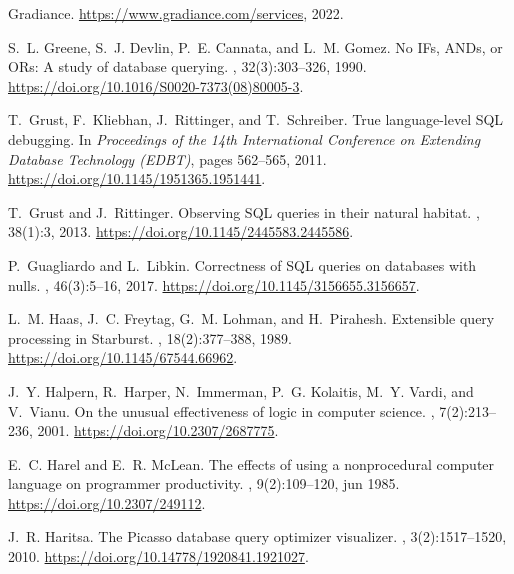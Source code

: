 \documentclass[letterpaper,11pt]{article}
\begin{document}
\begin{thebibliography}{100}
{Gradiance}.
\newblock \url{https://www.gradiance.com/services}, 2022.

S.~L. Greene, S.~J. Devlin, P.~E. Cannata, and L.~M. Gomez.
\newblock No {IFs}, {ANDs}, or {ORs}: A study of database querying.
, 32(3):303--326,
  1990.
\newblock \url{https://doi.org/10.1016/S0020-7373(08)80005-3}.

T.~Grust, F.~Kliebhan, J.~Rittinger, and T.~Schreiber.
\newblock True language-level {SQL} debugging.
\newblock In {\em Proceedings of the 14th International Conference on Extending
  Database Technology ({EDBT})}, pages 562--565, 2011.
\newblock \url{https://doi.org/10.1145/1951365.1951441}.

T.~Grust and J.~Rittinger.
\newblock Observing {SQL} queries in their natural habitat.
, 38(1):3, 2013.
\newblock \url{https://doi.org/10.1145/2445583.2445586}.

P.~Guagliardo and L.~Libkin.
\newblock Correctness of {SQL} queries on databases with nulls.
, 46(3):5--16, 2017.
\newblock \url{https://doi.org/10.1145/3156655.3156657}.

L.~M. Haas, J.~C. Freytag, G.~M. Lohman, and H.~Pirahesh.
\newblock Extensible query processing in {S}tarburst.
, 18(2):377--388, 1989.
\newblock \url{https://doi.org/10.1145/67544.66962}.

J.~Y. Halpern, R.~Harper, N.~Immerman, P.~G. Kolaitis, M.~Y. Vardi, and
  V.~Vianu.
\newblock On the unusual effectiveness of logic in computer science.
, 7(2):213--236, 2001.
\newblock \url{https://doi.org/10.2307/2687775}.

E.~C. Harel and E.~R. McLean.
\newblock The effects of using a nonprocedural computer language on programmer
  productivity.
, 9(2):109--120, jun 1985.
\newblock \url{https://doi.org/10.2307/249112}.

J.~R. Haritsa.
\newblock The {Picasso} database query optimizer visualizer.
, 3(2):1517--1520, 2010.
\newblock \url{https://doi.org/10.14778/1920841.1921027}.


\end{thebibliography}
\end{document}
